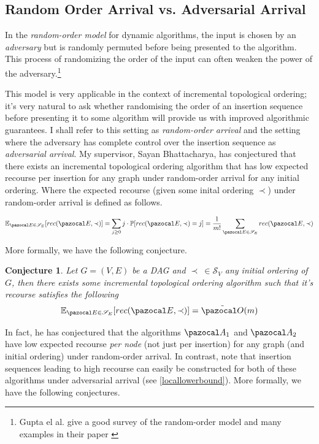 \documentclass{report}
\newtheorem{conjecture}[theorem]{Conjecture}
\begin{document}
\subsection{Random Order Arrival vs. Adversarial Arrival}

In the \textit{random-order model} for dynamic algorithms, the input is chosen by an \textit{adversary} but is randomly permuted before being presented to the algorithm. This process of randomizing the order of the input can often weaken the power of the adversary.\footnote{Gupta el al. give a good survey of the random-order model and many examples in their paper \cite{GuptaS20}}

This model is very applicable in the context of incremental topological ordering; it's very natural to ask whether randomising the order of an insertion sequence before presenting it to some algorithm will provide us with improved algorithmic guarantees. I shall refer to this setting as \textit{random-order arrival} and the setting where the adversary has complete control over the insertion sequence as \textit{adversarial arrival}. My supervisor, Sayan Bhattacharya, has conjectured that there exists an incremental topological ordering algorithm that has low expected recourse per insertion for any graph under random-order arrival for any initial ordering. Where the expected recourse (given some inital ordering $\prec$) under random-order arrival is defined as follows.

\[ \mathbb{E}_{\pazocal E \in \mathcal{S}_{E}}[rec(\pazocal E, \prec)] = \sum_{j \geq 0} j \cdot \mathbb{P}[rec(\pazocal E, \prec)=j] = \frac{1}{m!} \sum_{\pazocal E \in \mathcal S_E}rec(\pazocal E, \prec) \]

More formally, we have the following conjecture.

\begin{conjecture}\label{mainconjecture}
Let $G=(V,E)$ be a DAG and $\prec \: \in \mathcal S_V$ any initial ordering of $G$, then there exists some incremental topological ordering algorithm such that it's recourse satisfies the following
\[ \mathbb E_{\pazocal E \in \mathcal S_E}[rec(\pazocal E, \prec)] = \tilde{\pazocal O}(m) \]
\end{conjecture}

In fact, he has conjectured that the algorithms $\pazocal A_1$ and $\pazocal A_2$ have low expected recourse \textit{per node} (not just per insertion) for any graph (and initial ordering) under random-order arrival. In contrast, note that insertion sequences leading to high recourse can easily be constructed for both of these algorithms under adversarial arrival (see \ref{locallowerbound}). More formally, we have the following conjectures.
\end{document}

